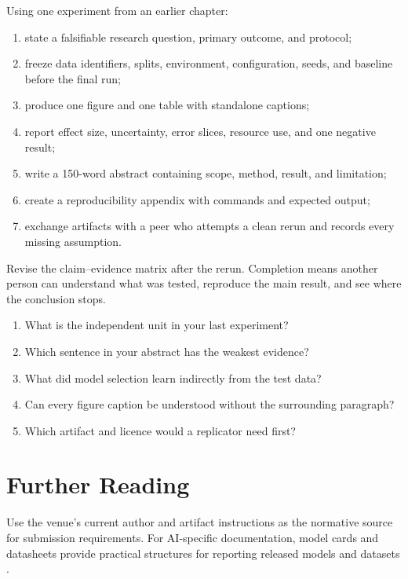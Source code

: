 \begin{practicallab}
Using one experiment from an earlier chapter:
\begin{enumerate}
    \item state a falsifiable research question, primary outcome, and protocol;
    \item freeze data identifiers, splits, environment, configuration, seeds,
          and baseline before the final run;
    \item produce one figure and one table with standalone captions;
    \item report effect size, uncertainty, error slices, resource use, and one
          negative result;
    \item write a 150-word abstract containing scope, method, result, and
          limitation;
    \item create a reproducibility appendix with commands and expected output;
    \item exchange artifacts with a peer who attempts a clean rerun and records
          every missing assumption.
\end{enumerate}
Revise the claim--evidence matrix after the rerun.
Completion means another person can understand what was tested, reproduce the
main result, and see where the conclusion stops.
\end{practicallab}

\begin{checkpoint}
\begin{enumerate}
    \item What is the independent unit in your last experiment?
    \item Which sentence in your abstract has the weakest evidence?
    \item What did model selection learn indirectly from the test data?
    \item Can every figure caption be understood without the surrounding
          paragraph?
    \item Which artifact and licence would a replicator need first?
\end{enumerate}
\end{checkpoint}

\section{Further Reading}

Use the venue's current author and artifact instructions as the normative
source for submission requirements.
For AI-specific documentation, model cards and datasheets provide practical
structures for reporting released models and datasets
\cite{mitchellModelCardsModel2019,gebruDatasheetsDatasets2021}.
